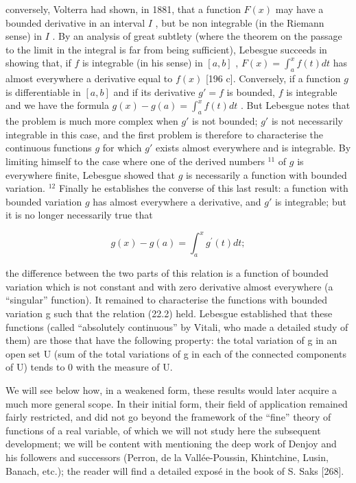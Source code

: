conversely, Volterra had shown, in 1881, that a function \(F(x)\) may have a bounded derivative in an interval \(I\) , but be non integrable (in the Riemann sense) in \(I\) . By an analysis of great subtlety (where the theorem on the passage to the limit in the integral is far from being sufficient), Lebesgue succeeds in showing that, if \(f\) is integrable (in his sense) in \([a,b]\) , \(F(x) = \int_{a}^{x} f(t) dt\) has almost everywhere a derivative equal to \(f(x)\) {[}196 c{]}. Conversely, if a function \(g\) is differentiable in \([a,b]\) and if its derivative \(g' = f\) is bounded, \(f\) is integrable and we have the formula \(g(x) - g(a) = \int_{a}^{x} f(t) dt\) . But Lebesgue notes that the problem is much more complex when \(g'\) is not bounded; \(g'\) is not necessarily integrable in this case, and the first problem is therefore to characterise the continuous functions \(g\) for which \(g'\) exists almost everywhere and is integrable. By limiting himself to the case where one of the derived numbers \(^{11}\) of \(g\) is everywhere finite, Lebesgue showed that \(g\) is necessarily a function with bounded variation. \(^{12}\) Finally he establishes the converse of this last result: a function with bounded variation \(g\) has almost everywhere a derivative, and \(g'\) is integrable; but it is no longer necessarily true that

\[
g (x) - g (a) = \int_ {a} ^ {x} g ^ {\prime} (t) d t;\tag{22.2}
\]

the difference between the two parts of this relation is a function of bounded variation which is not constant and with zero derivative almost everywhere (a ``singular'' function). It remained to characterise the functions with bounded variation g such that the relation (22.2) held. Lebesgue established that these functions (called ``absolutely continuous'' by Vitali, who made a detailed study of them) are those that have the following property: the total variation of g in an open set U (sum of the total variations of g in each of the connected components of U) tends to 0 with the measure of U.

We will see below how, in a weakened form, these results would later acquire a much more general scope. In their initial form, their field of application remained fairly restricted, and did not go beyond the framework of the ``fine'' theory of functions of a real variable, of which we will not study here the subsequent development; we will be content with mentioning the deep work of Denjoy and his followers and successors (Perron, de la Vallée-Poussin, Khintchine, Lusin, Banach, etc.); the reader will find a detailed exposé in the book of S. Saks {[}268{]}.

